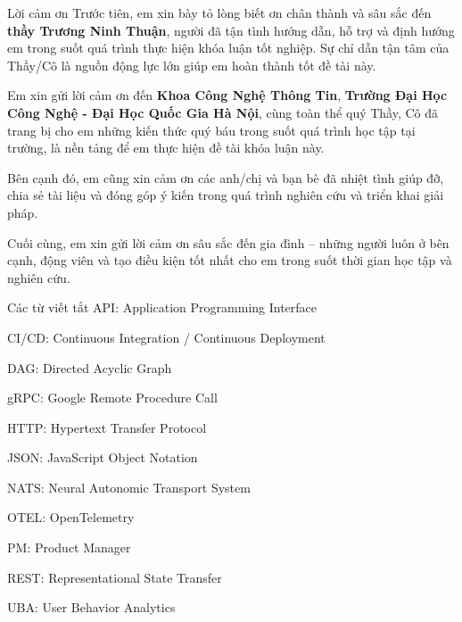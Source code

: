 \documentclass{uetgraduation}
\begin{document}
\begin{preamble}{Lời cảm ơn}
Trước tiên, em xin bày tỏ lòng biết ơn chân thành và sâu sắc đến 
\textbf{thầy Trương Ninh Thuận}, người đã tận tình hướng dẫn, hỗ trợ và định hướng em 
trong suốt quá trình thực hiện khóa luận tốt nghiệp. 
Sự chỉ dẫn tận tâm của Thầy/Cô là nguồn động lực lớn giúp em hoàn thành tốt đề tài này.

Em xin gửi lời cảm ơn đến \textbf{Khoa Công Nghệ Thông Tin}, \textbf{Trường Đại Học Công Nghệ - Đại Học Quốc Gia Hà Nội}, 
cùng toàn thể quý Thầy, Cô đã trang bị cho em những kiến thức quý báu trong suốt quá trình học tập tại trường, 
là nền tảng để em thực hiện đề tài khóa luận này.

Bên cạnh đó, em cũng xin cảm ơn các anh/chị và bạn bè đã nhiệt tình giúp đỡ, 
chia sẻ tài liệu và đóng góp ý kiến trong quá trình nghiên cứu và triển khai giải pháp.

Cuối cùng, em xin gửi lời cảm ơn sâu sắc đến gia đình – 
những người luôn ở bên cạnh, động viên và tạo điều kiện tốt nhất cho em trong suốt thời gian học tập và nghiên cứu.

\vspace{3cm}


\end{preamble}

\begin{contentlisting}

\tableofcontents
\listoffigures
\listoftables

\begin{contentlistingsection}{Các từ viết tắt}
 API: Application Programming Interface

CI/CD: Continuous Integration / Continuous Deployment

DAG: Directed Acyclic Graph

gRPC: Google Remote Procedure Call

HTTP: Hypertext Transfer Protocol

JSON: JavaScript Object Notation

NATS: Neural Autonomic Transport System

OTEL: OpenTelemetry

PM: Product Manager

REST: Representational State Transfer

UBA: User Behavior Analytics
\end{contentlistingsection}

\end{contentlisting}
\end{document}
